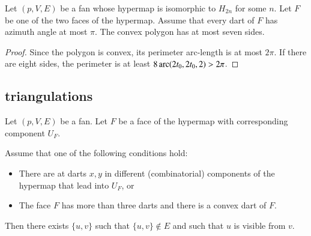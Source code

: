 \begin{lemma}
    \label{lemma:7-sides}
Let $(p,V,E)$ be a fan whose hypermap is isomorphic
to $H_{2n}$ for some $n$.  Let $F$ be one of the two faces of the
hypermap.  Assume that every dart of $F$ has azimuth angle at
most $\pi$.  
The convex polygon has at most seven sides.
\end{lemma}

\begin{proof}
Since the polygon is convex, its perimeter arc-length is at
most $2\pi$.  If there are eight sides, the perimeter
is at least $8\operatorname{arc}(2t_0,2t_0,2)>2\pi$.
\end{proof}




\subsection{triangulations}

Let $(p,V,E)$ be a fan.  Let $F$ be a face of the hypermap
with corresponding component $U_F$.

\begin{lemma} Assume that one of the following conditions hold:
\begin{itemize} 
  \item There are at darts $x,y$ in different (combinatorial) components of the 
   hypermap that lead into $U_F$, or
  \item The face $F$ has more than three darts and there is a convex dart of $F$.
\end{itemize}
Then there exists $\{u,v\}$ such that $\{u,v\}\not\in E$ and such
that $u$ is visible from $v$.
\end{lemma}

